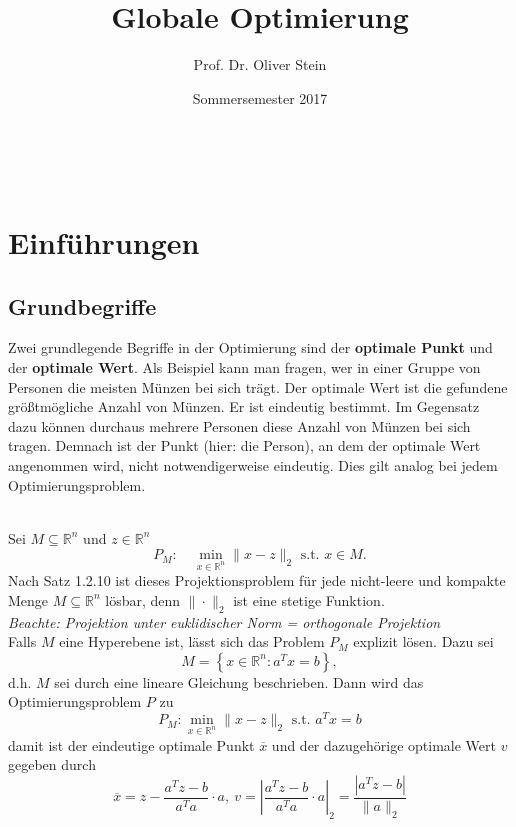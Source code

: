 \documentclass[12pt]{extreport} %
\title{Globale Optimierung}
\author{Prof. Dr. Oliver Stein}
\date{Sommersemester 2017}
\makeatletter
\newcommand{\R}{\mathbb{R}}
\theoremstyle{named}
\theoremstyle{nnamed}
\theoremstyle{itshape}
\theoremstyle{normal}
\def\maketitle{ \begin{titlepage} 
			~\vspace{3cm} 
		\begin{center} {\Huge \@title} \end{center} 
	 		\vspace*{1cm} 
	 	\begin{center} {\large \@author} \end{center} 
	 	\vspace*{-0.5cm}
	 	\begin{center} \@date \end{center} 
	 		\vspace*{7cm} 
	 	\begin{center} \@publishers \end{center} 
	 		\vfill 
	\end{titlepage} }
\makeatother
\begin{document}
\thispagestyle{empty}

\begin{titlepage}
	\maketitle
	\thispagestyle{empty}
\end{titlepage}



\chapter{Einführungen}

\section{Grundbegriffe}

Zwei grundlegende Begriffe in der Optimierung sind der \textbf{optimale Punkt} und der \textbf{optimale Wert}. Als Beispiel kann man fragen, wer in einer Gruppe von Personen die meisten Münzen bei sich trägt. Der optimale Wert ist die gefundene größtmögliche Anzahl von Münzen. Er ist eindeutig bestimmt. Im Gegensatz dazu können durchaus mehrere Personen diese Anzahl von Münzen bei sich tragen. Demnach ist der Punkt (hier: die Person), an dem der optimale Wert angenommen wird, nicht notwendigerweise eindeutig. Dies gilt analog bei jedem Optimierungsproblem.

\begin{beispiel} ~\\
Sei $M \subseteq \R^n$ und $z \in \R^n$
$$ P_M: \quad \min_{x \in \R^n} \| x - z \|_2 \text{ s.t. } x \in M. $$
Nach Satz 1.2.10 ist dieses Projektionsproblem für jede nicht-leere und kompakte Menge $M \subseteq \R^n$ lösbar, denn $\| \cdot \|_2$ ist eine stetige Funktion. ~\\

\textit{Beachte: Projektion unter euklidischer Norm = orthogonale Projektion} ~\\

Falls $M$ eine Hyperebene ist, lässt sich das Problem $P_M$ explizit lösen. Dazu sei 
$$ M = \left\{ x \in \R^n \colon a^T x = b \right\}, $$
d.h. $M$ sei durch eine lineare Gleichung beschrieben. Dann wird das Optimierungsproblem $P$ zu
$$ P_M\colon \min_{x \in \R^n} \| x - z \|_2 \text{ s.t. } a^Tx = b $$
damit ist der eindeutige optimale Punkt $\overline{x}$ und der dazugehörige optimale Wert $v$ gegeben durch
$$ \overline{x} = z - \frac{a^T z - b}{a^T a} \cdot a, ~ v = \left| \frac{a^T z - b}{a^T a} \cdot a \right|_2 = \frac{\left| a^T z - b \right|}{\| a \|_2}$$
\end{beispiel}
\end{document}
